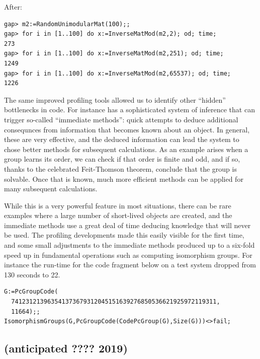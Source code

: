\documentclass{deliverablereport}
\begin{document}
After:

{\small
\begin{verbatim}
gap> m2:=RandomUnimodularMat(100);;
gap> for i in [1..100] do x:=InverseMatMod(m2,2); od; time;
273
gap> for i in [1..100] do x:=InverseMatMod(m2,251); od; time;
1249
gap> for i in [1..100] do x:=InverseMatMod(m2,65537); od; time;
1226
\end{verbatim}

}

The same improved profiling tools allowed us to identify other
``hidden'' bottlenecks in \GAP code. For instance \GAP has a
sophisticated system of inference that can trigger 
so-called ``immediate methods'': quick attempts to deduce additional
consequnces from information that becomes known about an object.
In general, these are very effective, and the deduced information can
lead the system to chose better methods for subsequent
calculations. As an example arises when a group learns its order, we
can check if that order is finite and odd, and if so, thanks to the celebrated
Feit-Thomson theorem, conclude that the group is solvable. Once that
is known, much more efficient methods can be applied for many
subsequent calculations.

While this is a very powerful feature in most situations, there can be
rare examples where a large number of short-lived objects are created,
and the immediate methods use a great deal of time deducing knowledge
that will never be used. The profiling developments made this 
easily visible for the first time, and some small adjustments to the
immediate methods produced up to a six-fold speed up in fundamental
operations such as computing isomorphism groups. For instance the
run-time for the code fragment below on a test system dropped from 130
seconds to 22.


{\small
\begin{verbatim}
G:=PcGroupCode( 
  741231213963541373679312045151639276850536621925972119311,
  11664);;
IsomorphismGroups(G,PcGroupCode(CodePcGroup(G),Size(G)))<>fail;
\end{verbatim}
}


\subsection{ (anticipated ???? 2019)}\label{gap-4.11}

\end{document}
